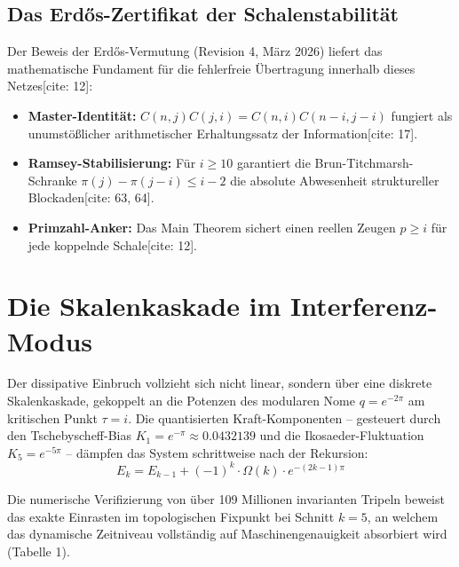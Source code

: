 \documentclass[12pt,a4paper]{article}
\begin{document}
	\subsection{Das Erdős-Zertifikat der Schalenstabilität}
	Der Beweis der Erd\H{o}s-Vermutung (Revision 4, März 2026) liefert das mathematische Fundament für die fehlerfreie Übertragung innerhalb dieses Netzes[cite: 12]:
	\begin{itemize}
		\item \textbf{Master-Identität:} $C(n,j) C(j,i) = C(n,i) C(n-i, j-i)$ fungiert als unumstößlicher arithmetischer Erhaltungssatz der Information[cite: 17].
		\item \textbf{Ramsey-Stabilisierung:} Für $i \ge 10$ garantiert die Brun-Titchmarsh-Schranke $\pi(j) - \pi(j-i) \le i-2$ die absolute Abwesenheit struktureller Blockaden[cite: 63, 64].
		\item \textbf{Primzahl-Anker:} Das Main Theorem sichert einen reellen Zeugen $p \ge i$ für jede koppelnde Schale[cite: 12].
	\end{itemize}
	
	\section{Die Skalenkaskade im Interferenz-Modus}
	Der dissipative Einbruch vollzieht sich nicht linear, sondern über eine diskrete Skalenkaskade, gekoppelt an die Potenzen des modularen Nome $q=e^{-2\pi}$ am kritischen Punkt $\tau=i$. Die quantisierten Kraft-Komponenten -- gesteuert durch den Tschebyscheff-Bias $K_1 = e^{-\pi} \approx 0.0432139$ und die Ikosaeder-Fluktuation $K_5 = e^{-5\pi}$ -- dämpfen das System schrittweise nach der Rekursion:
	\begin{equation}
		E_{k}=E_{k-1}+(-1)^{k}\cdot\Omega(k)\cdot e^{-(2k-1)\pi}
	\end{equation}
	
	Die numerische Verifizierung von über 109 Millionen invarianten Tripeln beweist das exakte Einrasten im topologischen Fixpunkt bei Schnitt $k=5$, an welchem das dynamische Zeitniveau vollständig auf Maschinengenauigkeit absorbiert wird (Tabelle 1).
	
\end{document}
